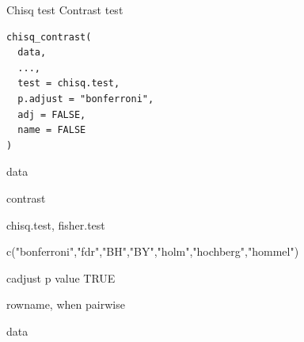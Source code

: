 \documentclass[a4paper]{book}
\begin{document}
%
\begin{Description}
Chisq test Contrast test
\end{Description}
%
\begin{Usage}
\begin{verbatim}
chisq_contrast(
  data,
  ...,
  test = chisq.test,
  p.adjust = "bonferroni",
  adj = FALSE,
  name = FALSE
)
\end{verbatim}
\end{Usage}
%
\begin{Arguments}
\begin{ldescription}
\item[\code{data}] data

\item[\code{...}] contrast

\item[\code{test}] chisq.test, fisher.test

\item[\code{p.adjust}] c("bonferroni","fdr","BH","BY","holm","hochberg","hommel")

\item[\code{adj}] cadjust p value TRUE

\item[\code{name}] rowname, when  pairwise
\end{ldescription}
\end{Arguments}
%
\begin{Value}
data
\end{Value}
%
\end{document}
